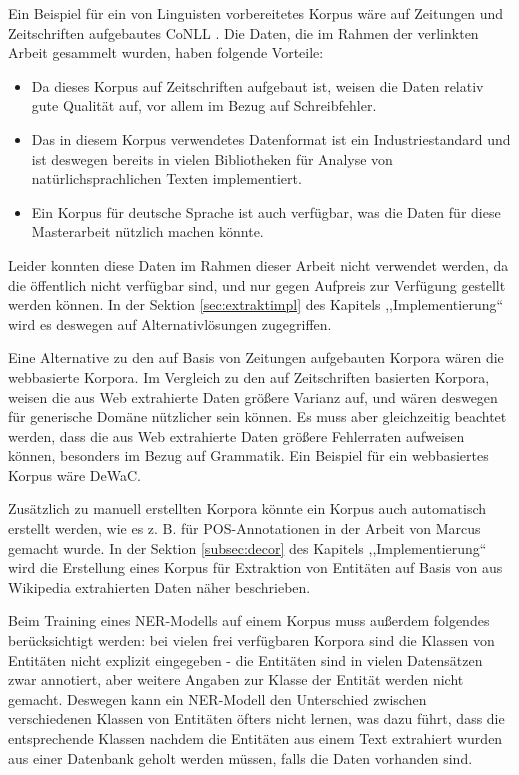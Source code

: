 Ein Beispiel für ein von Linguisten vorbereitetes Korpus wäre auf Zeitungen und Zeitschriften aufgebautes CoNLL \cite{tjong2003introduction}. Die Daten, die im Rahmen der verlinkten Arbeit gesammelt wurden, haben folgende Vorteile:
\begin{itemize}
\item Da dieses Korpus auf Zeitschriften aufgebaut ist, weisen die Daten relativ gute Qualität auf, vor allem im Bezug auf Schreibfehler.
\item Das in diesem Korpus verwendetes Datenformat ist ein Industriestandard und ist deswegen bereits in vielen Bibliotheken für Analyse von natürlichsprachlichen Texten implementiert. 
\item Ein Korpus für deutsche Sprache ist auch verfügbar, was die Daten für diese Masterarbeit nützlich machen könnte.
\end{itemize}
Leider konnten diese Daten im Rahmen dieser Arbeit nicht verwendet werden, da die öffentlich nicht verfügbar sind, und nur gegen Aufpreis zur Verfügung gestellt werden können. In der Sektion \ref{sec:extraktimpl} des Kapitels ,,Implementierung`` wird es deswegen auf Alternativlösungen zugegriffen.

Eine Alternative zu den auf Basis von Zeitungen aufgebauten Korpora wären die webbasierte Korpora\cite{liu2006web}. Im Vergleich zu den auf Zeitschriften basierten Korpora, weisen die aus Web extrahierte Daten größere Varianz auf, und wären deswegen für generische Domäne nützlicher sein können. Es muss aber gleichzeitig beachtet werden, dass die aus Web extrahierte Daten größere Fehlerraten aufweisen können, besonders im Bezug auf Grammatik. Ein Beispiel für ein webbasiertes Korpus wäre DeWaC\cite{baroni2009wacky}.

Zusätzlich zu manuell erstellten Korpora könnte ein Korpus auch automatisch erstellt werden, wie es z. B. für POS-Annotationen in der Arbeit von Marcus\cite{marcus1993building} gemacht wurde. In der Sektion \ref{subsec:decor} des Kapitels ,,Implementierung`` wird die Erstellung eines Korpus für Extraktion von Entitäten auf Basis von aus Wikipedia extrahierten Daten näher beschrieben.

Beim Training eines NER-Modells auf einem Korpus muss außerdem folgendes berücksichtigt werden: bei vielen frei verfügbaren Korpora sind die Klassen von Entitäten nicht explizit eingegeben - die Entitäten sind in vielen Datensätzen zwar annotiert, aber weitere Angaben zur Klasse der Entität werden nicht gemacht. Deswegen kann ein NER-Modell den Unterschied zwischen verschiedenen Klassen von Entitäten öfters nicht lernen, was dazu führt, dass die entsprechende Klassen nachdem die Entitäten aus einem Text extrahiert wurden aus einer Datenbank geholt werden müssen, falls die Daten vorhanden sind.

